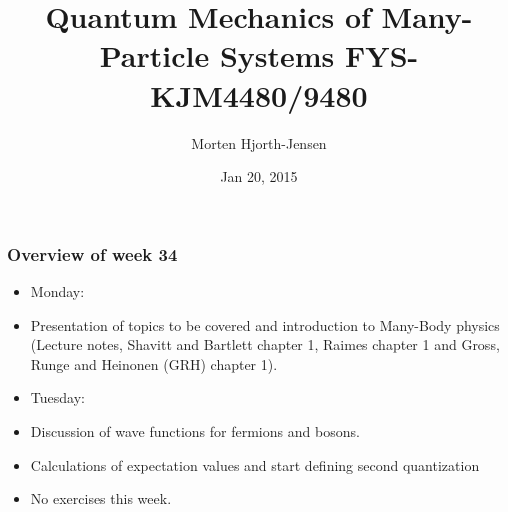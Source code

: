 \documentclass{beamer}
\begin{document}




\title{Quantum Mechanics of Many-Particle Systems FYS-KJM4480/9480}


\author{Morten Hjorth-Jensen}

\date{Jan 20, 2015
}

\begin{frame}
\titlepage
\end{frame}

\begin{frame}
\frametitle{Overview of week 34}

\begin{block}{}
\begin{itemize}
\item Monday:

\item Presentation of topics to be covered and introduction to Many-Body physics (Lecture notes, Shavitt and Bartlett chapter 1, Raimes chapter 1 and Gross, Runge and Heinonen (GRH) chapter 1).

\item Tuesday:

\item Discussion of wave functions for fermions and bosons.

\item Calculations of expectation values and start defining second quantization

\item No exercises this week.
\end{itemize}

\noindent
\end{block}
\end{frame}
\end{document}
